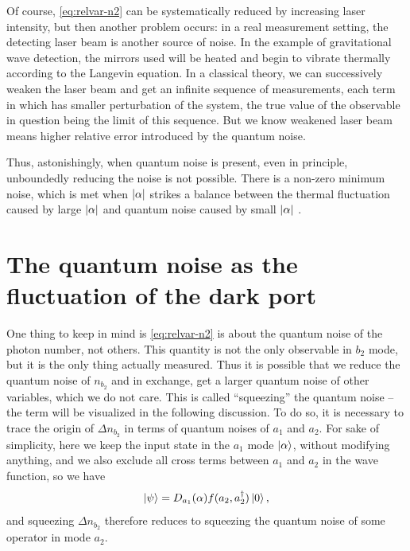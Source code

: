\documentclass[hyperref, a4paper]{article}
\begin{document}
Of course, \eqref{eq:relvar-n2} can be systematically reduced by increasing laser intensity,
but then another problem occurs:
in a real measurement setting,
the detecting laser beam is another source of noise.
In the example of gravitational wave detection,
the mirrors used will be heated
and begin to vibrate thermally according to the Langevin equation.
In a classical theory,
we can successively weaken the laser beam 
and get an infinite sequence of measurements,
each term in which has smaller perturbation of the system,
the true value of the observable in question being the limit of this sequence.
But we know weakened laser beam means higher relative error 
introduced by the quantum noise.

Thus, astonishingly,
when quantum noise is present, 
even in principle, 
unboundedly reducing the noise is not possible.
There is a non-zero minimum noise,
which is met when $\abs{\alpha}$ strikes a balance 
between the thermal fluctuation caused by large $\abs{\alpha}$
and quantum noise caused by small $\abs{\alpha}$ \cite{caves_quantum-mechanical_1981}.


\section{The quantum noise as the fluctuation of the dark port}\label{sec:dark-port-analysis}

One thing to keep in mind is \eqref{eq:relvar-n2} 
is about the quantum noise of the photon number, not others.
This quantity is not the only observable in $b_2$ mode,
but it is the only thing actually measured.
Thus it is possible that we reduce the quantum noise of $n_{b_2}$
and in exchange, get a larger quantum noise of other variables,
which we do not care.
This is called ``squeezing'' the quantum noise
-- the term will be visualized in the following discussion.
To do so, it is necessary to trace the origin of $\Delta{n_{b_2}}$ 
in terms of quantum noises of $a_1$ and $a_2$. 
For sake of simplicity,
here we keep the input state in the $a_1$ mode $\ket{\alpha}$,
without modifying anything,
and we also exclude all cross terms between $a_1$ and $a_2$ in the wave function, 
so we have 
\begin{equation}
    \ket{\psi} = D_{a_1}(\alpha) f(a_2, a_2^\dagger) \ket{0},
    \label{eq:coherent-plus-squeeze}
\end{equation}
and squeezing $\Delta{n_{b_2}}$ therefore reduces to squeezing the quantum noise of some operator in mode $a_2$.
\end{document}
